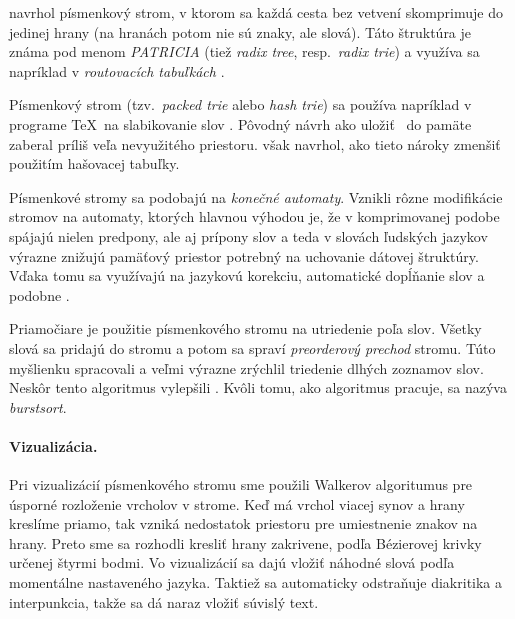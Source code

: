 \citet{patricia} navrhol písmenkový strom, v ktorom sa každá cesta bez vetvení
skomprimuje do jedinej hrany (na hranách potom nie sú znaky, ale slová).
Táto štruktúra je známa pod menom \emph{PATRICIA} (tiež \emph{radix tree},
resp.\ \emph{radix trie}) a využíva sa napríklad v \emph{routovacích tabuľkách}
\citep{radix}.

Písmenkový strom (tzv.\ \emph{packed trie} alebo \emph{hash trie}) sa používa
napríklad v programe \TeX\ na slabikovanie slov \citep{liang}.
Pôvodný návrh \citep{fredkin} ako uložiť \trie\ do pamäte zaberal
príliš veľa nevyužitého priestoru. \citet{liang} však navrhol, ako
tieto nároky zmenšiť použitím hašovacej tabuľky.

Písmenkové stromy sa podobajú na \emph{konečné automaty}. 
Vznikli rôzne modifikácie stromov na automaty, ktorých hlavnou výhodou je, 
že v komprimovanej podobe spájajú nielen predpony, ale aj prípony slov 
a teda v slovách ľudských jazykov výrazne znižujú pamäťový priestor potrebný 
na uchovanie dátovej štruktúry. Vďaka tomu sa využívajú na jazykovú korekciu, 
automatické dopĺňanie slov a podobne \citep{scrabble,ca}. 

Priamočiare je použitie písmenkového stromu na utriedenie poľa slov. 
Všetky slová sa pridajú do stromu a potom sa spraví \emph{preorderový prechod} 
stromu. Túto myšlienku spracovali \citet{burstsort1} a veľmi výrazne zrýchlil 
triedenie dlhých zoznamov slov. Neskôr tento algoritmus vylepšili 
\citet{burstsort2}. Kvôli tomu, ako algoritmus pracuje, 
sa nazýva \emph{burstsort}.


\paragraph{Vizualizácia.} Pri vizualizácií písmenkového stromu sme použili 
Walkerov algoritumus pre úsporné rozloženie vrcholov v strome. 
\citep{walker} Keď má vrchol viacej synov a hrany kreslíme priamo, tak vzniká 
nedostatok priestoru pre umiestnenie znakov na hrany. Preto sme sa rozhodli 
kresliť hrany zakrivene, podľa Bézierovej krivky určenej štyrmi bodmi. 
Vo vizualizácií sa dajú vložiť náhodné slová podľa momentálne nastaveného 
jazyka. Taktiež sa automaticky odstraňuje diakritika a interpunkcia, takže 
sa dá naraz vložiť súvislý text.
